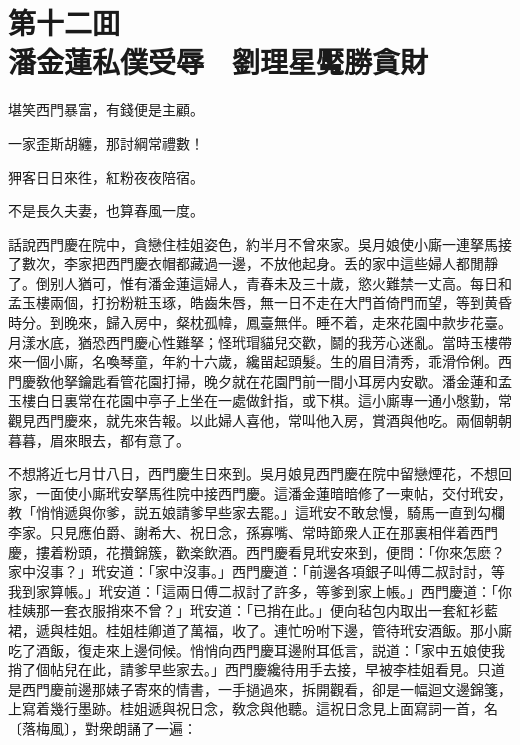 
\chapter*{第十二囬　\\潘金蓮私僕受辱　劉理星魘勝貪財}


\begin{myquote}
堪笑西門暴富，有錢便是主顧。

一家歪斯胡纏，那討綱常禮數！

狎客日日來徃，紅粉夜夜陪宿。

不是長久夫妻，也算春風一度。
\end{myquote}

話說西門慶在院中，貪戀住桂姐姿色，約半月不曾來家。吳月娘使小廝一連拏馬接了數次，李家把西門慶衣帽都藏過一邊，不放他起身。丢的家中這些婦人都閒靜了。倒别人猶可，惟有潘金蓮這婦人，青春未及三十歲，慾火難禁一丈高。每日和孟玉樓兩個，打扮粉粧玉琢，皓齒朱唇，無一日不走在大門首倚門而望，等到黄昏時分。到晚來，歸入房中，粲枕孤幃，鳳臺無伴。睡不着，走來花園中款步花臺。月漾水底，猶恐西門慶心性難拏；怪玳瑁貓兒交歡，鬬的我芳心迷亂。當時玉樓帶來一個小廝，名喚琴童，年約十六歲，纔㽞起頭髮。生的眉目清秀，乖滑伶俐。西門慶敎他拏鑰匙看管花園打掃，晚夕就在花園門前一間小耳房内安歇。潘金蓮和孟玉樓白日裏常在花園中亭子上坐在一處做針指，或下棋。這小廝專一通小慇勤，常觀見西門慶來，就先來告報。以此婦人喜他，常叫他入房，賞酒與他吃。兩個朝朝暮暮，眉來眼去，都有意了。

不想將近七月廿八日，西門慶生日來到。吳月娘見西門慶在院中留戀煙花，不想回家，一面使小廝玳安拏馬徃院中接西門慶。這潘金蓮暗暗修了一柬帖，交付玳安，教「悄悄遞與你爹，説五娘請爹早些家去罷。」這玳安不敢怠慢，騎馬一直到勾欄李家。只見應伯爵、謝希大、祝日念，孫寡嘴、常時節衆人正在那裏相伴着西門慶，摟着粉頭，花攢錦簇，歡楽飲酒。西門慶看見玳安來到，便問：「你來怎麽？家中沒事？」玳安道：「家中沒事。」西門慶道：「前邊各項銀子叫傅二叔討討，等我到家算帳。」玳安道：「這兩日傅二叔討了許多，等爹到家上帳。」西門慶道：「你桂姨那一套衣服捎來不曾？」玳安道：「已捎在此。」便向毡包内取出一套紅衫藍裙，遞與桂姐。桂姐桂卿道了萬福，收了。連忙吩咐下邊，管待玳安酒飯。那小廝吃了酒飯，復走來上邊伺候。悄悄向西門慶耳邊附耳低言，説道：「家中五娘使我捎了個帖兒在此，請爹早些家去。」西門慶纔待用手去接，早被李桂姐看見。只道是西門慶前邊那婊子寄來的情書，一手撾過來，拆開觀看，卻是一幅迴文邊錦箋，上寫着幾行墨跡。桂姐遞與祝日念，敎念與他聽。這祝日念見上面寫詞一首，名〔落梅風〕，對衆朗誦了一遍：

